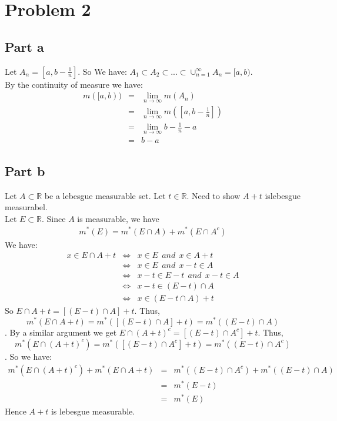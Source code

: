 \documentclass[12pt]{article}
\begin{document}
\section*{Problem 2}
\subsection*{Part a}
Let $A_n=[a,b-\frac{1}{n}]$. So We have:
$A_1 \subset A_2 \subset ... \subset \cup_{n=1}^{\infty}
A_n=[a,b)$. \\
By the continuity of measure we have:
\begin{eqnarray*}
m([a,b)) &=& \lim_{n \rightarrow \infty} m(A_n)
\\ &=&
\lim_{n \rightarrow \infty} m([a,b-\frac{1}{n}])
\\ &=&
\lim_{n \rightarrow \infty} b-\frac{1}{n}-a
\\ &=&
b-a
\end{eqnarray*}
\subsection*{Part b}
Let $A \subset \mathbb{R}$ be a lebesgue measurable set.
Let $t \in \mathbb{R}$. Need to show $A+t$ islebesgue measurabel. \\
Let $E \subset \mathbb{R}$. Since $A$ is measurable, we have
\begin{eqnarray}
m^*(E)=m^*(E \cap A)+m^*(E \cap A^c)
\end{eqnarray}
We have:
\begin{eqnarray*}
x \in E \cap A+t &\Longleftrightarrow &
x \in E \ \ and \ \ x \in A+t
\\ &\Longleftrightarrow &
x \in E \ \ and \ \ x-t \in A
\\ &\Longleftrightarrow &
x-t \in E-t \ \ and \ \ x-t \in A
\\ &\Longleftrightarrow &
x-t \in (E-t) \cap A
\\ &\Longleftrightarrow &
x \in (E-t \cap A) + t
\end{eqnarray*}
So $E \cap A+t = [(E-t) \cap A]+t$. Thus,
$$m^*(E \cap A+t)=m^*([(E-t) \cap A]+t)=m^*((E-t) \cap A)$$.
By a similar argument we get
$E \cap (A+t)^c = [(E-t) \cap A^c]+t$. Thus, 
$$m^*(E \cap (A+t)^c)=m^*([(E-t) \cap A^c]+t)=m^*((E-t) \cap A^c)$$.
So we have:
\begin{eqnarray*}
m^*(E \cap (A+t)^c)+m^*(E \cap A+t) &=&
m^*((E-t) \cap A^c)+m^*((E-t) \cap A) \\ &=&
m^*(E-t) \\ &=&
m^*(E)
\end{eqnarray*}
Hence $A+t$ is lebesgue measurable.
\end{document}
